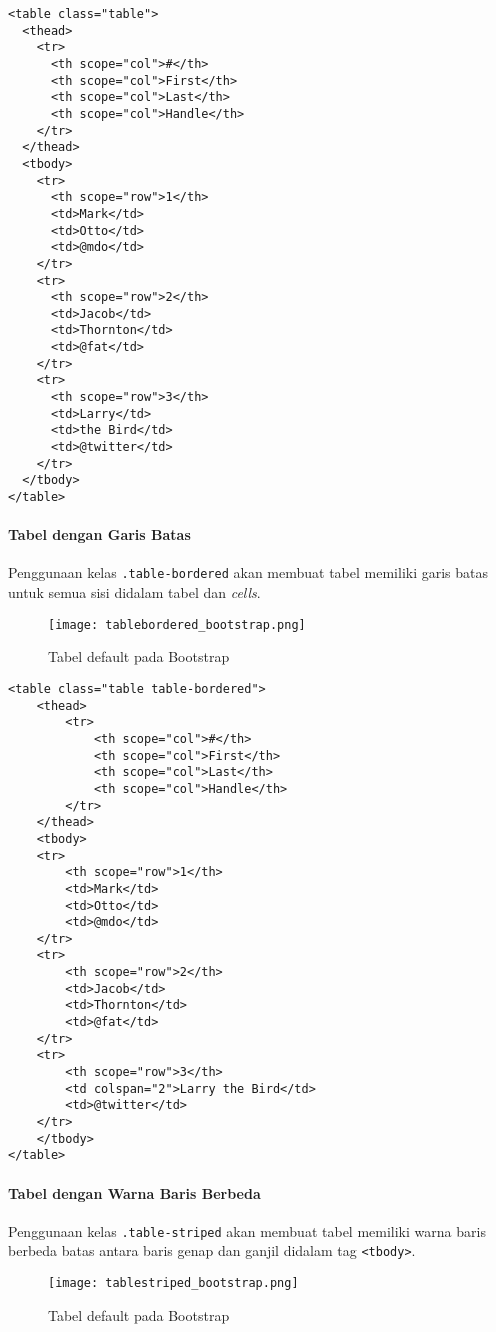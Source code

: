 {\begin{lstlisting}[frame=single] 
<table class="table">
  <thead>
    <tr>
      <th scope="col">#</th>
      <th scope="col">First</th>
      <th scope="col">Last</th>
      <th scope="col">Handle</th>
    </tr>
  </thead>
  <tbody>
    <tr>
      <th scope="row">1</th>
      <td>Mark</td>
      <td>Otto</td>
      <td>@mdo</td>
    </tr>
    <tr>
      <th scope="row">2</th>
      <td>Jacob</td>
      <td>Thornton</td>
      <td>@fat</td>
    </tr>
    <tr>
      <th scope="row">3</th>
      <td>Larry</td>
      <td>the Bird</td>
      <td>@twitter</td>
    </tr>
  </tbody>
</table>
\end{lstlisting}

\paragraph{Tabel dengan Garis Batas}
Penggunaan kelas \texttt{.table-bordered} akan membuat tabel memiliki garis batas untuk semua sisi didalam tabel dan \textit{cells}.

\begin{figure} [H]
	\centering  
	\texttt{[image: tablebordered\_bootstrap.png]}  
	\caption{Tabel default pada Bootstrap} 
\end{figure}

\begin{lstlisting}[frame=single] 
<table class="table table-bordered">
	<thead>
		<tr>
			<th scope="col">#</th>
			<th scope="col">First</th>
			<th scope="col">Last</th>
			<th scope="col">Handle</th>
		</tr>
	</thead>
	<tbody>
	<tr>
		<th scope="row">1</th>
		<td>Mark</td>
		<td>Otto</td>
		<td>@mdo</td>
	</tr>
	<tr>
		<th scope="row">2</th>
		<td>Jacob</td>
		<td>Thornton</td>
		<td>@fat</td>
	</tr>
	<tr>
		<th scope="row">3</th>
		<td colspan="2">Larry the Bird</td>
		<td>@twitter</td>
	</tr>
	</tbody>
</table>
\end{lstlisting}

\paragraph{Tabel dengan Warna Baris Berbeda}
Penggunaan kelas \texttt{.table-striped} akan membuat tabel memiliki warna baris berbeda batas antara baris genap dan ganjil didalam tag \texttt{<tbody>}.

\begin{figure} [H]
	\centering  
	\texttt{[image: tablestriped\_bootstrap.png]}  
	\caption{Tabel default pada Bootstrap} 
\end{figure}

}
